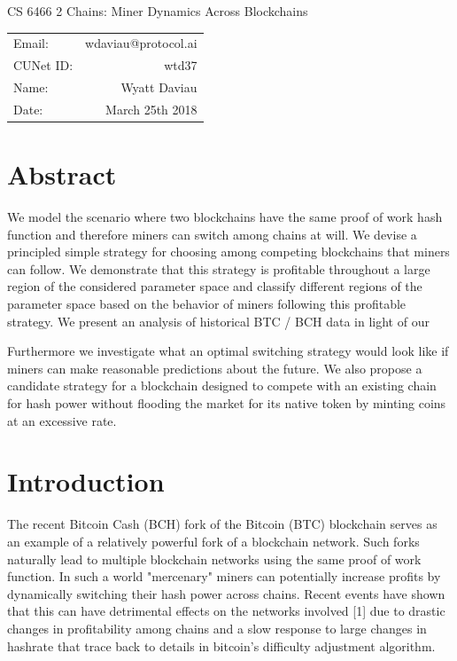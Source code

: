 \documentclass[10pt, preprint]{aastex}
\begin{document}
\begin{center}
{\Large CS 6466 2 Chains: Miner Dynamics Across Blockchains}


\begin{tabular}{lr}
Email: & wdaviau@protocol.ai \\
CUNet ID: & wtd37 \\
Name: & Wyatt Daviau \\
Date: & March 25th 2018 \\
\end{tabular}
\end{center}


\section{Abstract}
We model the scenario where two blockchains have the same proof of work hash function and therefore miners can switch among chains at will.  We devise a principled simple strategy for choosing among competing blockchains that miners can follow.  We demonstrate that this strategy is profitable throughout a large region of the considered parameter space and classify different regions of the parameter space based on the behavior of miners following this profitable strategy.  We present an analysis of historical BTC / BCH data in light of our 

Furthermore we investigate what an optimal switching strategy would look like if miners can make reasonable predictions about the future.  We also propose a candidate strategy for a blockchain designed to compete with an existing chain for hash power without flooding the market for its native token by minting coins at an excessive rate.

\section{Introduction}
The recent Bitcoin Cash (BCH) fork of the Bitcoin (BTC) blockchain serves as an example of a relatively powerful fork of a blockchain network.  Such forks naturally lead to multiple blockchain networks using the same proof of work function.  In such a world "mercenary" miners can potentially increase profits by dynamically switching their hash power across chains.  Recent events have shown that this can have detrimental effects on the networks involved [1] due to drastic changes in profitability among chains and a slow response to large changes in hashrate that trace back to details in bitcoin's difficulty adjustment algorithm.
\end{document}
